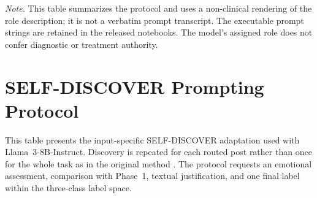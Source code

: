 \documentclass{ieeeaccess}
\begin{document}
\noindent\footnotesize\textit{Note.} This table summarizes the protocol and uses a non-clinical rendering of the role description; it is not a verbatim prompt transcript. The executable prompt strings are retained in the released notebooks. The model's assigned role does not confer diagnostic or treatment authority.\normalsize


\section{SELF-DISCOVER Prompting Protocol}

This table presents the input-specific SELF-DISCOVER adaptation used with Llama~3-8B-Instruct. Discovery is repeated for each routed post rather than once for the whole task as in the original method \cite{ref18}. The protocol requests an emotional assessment, comparison with Phase~1, textual justification, and one final label within the three-class label space.
\end{document}
